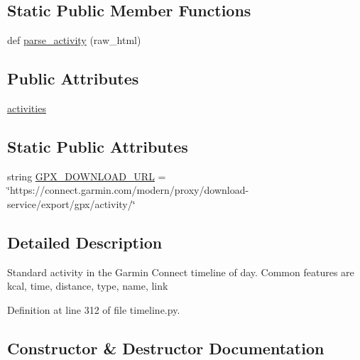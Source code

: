 \subsection*{Static Public Member Functions}
\begin{DoxyCompactItemize}
\item 
def \hyperlink{classpygce_1_1models_1_1garmin_1_1timeline_1_1_g_c_day_activities_a3e5401673c704697c90e814affe368ca}{parse\+\_\+activity} (raw\+\_\+html)
\end{DoxyCompactItemize}
\subsection*{Public Attributes}
\begin{DoxyCompactItemize}
\item 
\hyperlink{classpygce_1_1models_1_1garmin_1_1timeline_1_1_g_c_day_activities_a8f48f44c8208989ea0741bad614ae652}{activities}
\end{DoxyCompactItemize}
\subsection*{Static Public Attributes}
\begin{DoxyCompactItemize}
\item 
string \hyperlink{classpygce_1_1models_1_1garmin_1_1timeline_1_1_g_c_day_activities_a7c9d6ef796f6dff125216b04b40dc668}{G\+P\+X\+\_\+\+D\+O\+W\+N\+L\+O\+A\+D\+\_\+\+U\+RL} = \char`\"{}https\+://connect.\+garmin.\+com/modern/proxy/download-\/service/export/gpx/activity/\char`\"{}
\end{DoxyCompactItemize}


\subsection{Detailed Description}
\begin{DoxyVerb}Standard activity in the Garmin Connect timeline of day.
Common features are kcal, time, distance, type, name, link
\end{DoxyVerb}
 

Definition at line 312 of file timeline.\+py.



\subsection{Constructor \& Destructor Documentation}
\mbox{\label{classpygce_1_1models_1_1garmin_1_1timeline_1_1_g_c_day_activities_abde52d1321a233947e2585e7ed43415b}} 
